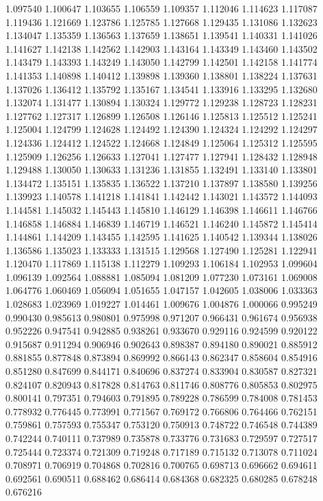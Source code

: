 1.097540
1.100647
1.103655
1.106559
1.109357
1.112046
1.114623
1.117087
1.119436
1.121669
1.123786
1.125785
1.127668
1.129435
1.131086
1.132623
1.134047
1.135359
1.136563
1.137659
1.138651
1.139541
1.140331
1.141026
1.141627
1.142138
1.142562
1.142903
1.143164
1.143349
1.143460
1.143502
1.143479
1.143393
1.143249
1.143050
1.142799
1.142501
1.142158
1.141774
1.141353
1.140898
1.140412
1.139898
1.139360
1.138801
1.138224
1.137631
1.137026
1.136412
1.135792
1.135167
1.134541
1.133916
1.133295
1.132680
1.132074
1.131477
1.130894
1.130324
1.129772
1.129238
1.128723
1.128231
1.127762
1.127317
1.126899
1.126508
1.126146
1.125813
1.125512
1.125241
1.125004
1.124799
1.124628
1.124492
1.124390
1.124324
1.124292
1.124297
1.124336
1.124412
1.124522
1.124668
1.124849
1.125064
1.125312
1.125595
1.125909
1.126256
1.126633
1.127041
1.127477
1.127941
1.128432
1.128948
1.129488
1.130050
1.130633
1.131236
1.131855
1.132491
1.133140
1.133801
1.134472
1.135151
1.135835
1.136522
1.137210
1.137897
1.138580
1.139256
1.139923
1.140578
1.141218
1.141841
1.142442
1.143021
1.143572
1.144093
1.144581
1.145032
1.145443
1.145810
1.146129
1.146398
1.146611
1.146766
1.146858
1.146884
1.146839
1.146719
1.146521
1.146240
1.145872
1.145414
1.144861
1.144209
1.143455
1.142595
1.141625
1.140542
1.139344
1.138026
1.136586
1.135023
1.133333
1.131515
1.129568
1.127490
1.125281
1.122941
1.120470
1.117869
1.115138
1.112279
1.109293
1.106184
1.102953
1.099604
1.096139
1.092564
1.088881
1.085094
1.081209
1.077230
1.073161
1.069008
1.064776
1.060469
1.056094
1.051655
1.047157
1.042605
1.038006
1.033363
1.028683
1.023969
1.019227
1.014461
1.009676
1.004876
1.000066
0.995249
0.990430
0.985613
0.980801
0.975998
0.971207
0.966431
0.961674
0.956938
0.952226
0.947541
0.942885
0.938261
0.933670
0.929116
0.924599
0.920122
0.915687
0.911294
0.906946
0.902643
0.898387
0.894180
0.890021
0.885912
0.881855
0.877848
0.873894
0.869992
0.866143
0.862347
0.858604
0.854916
0.851280
0.847699
0.844171
0.840696
0.837274
0.833904
0.830587
0.827321
0.824107
0.820943
0.817828
0.814763
0.811746
0.808776
0.805853
0.802975
0.800141
0.797351
0.794603
0.791895
0.789228
0.786599
0.784008
0.781453
0.778932
0.776445
0.773991
0.771567
0.769172
0.766806
0.764466
0.762151
0.759861
0.757593
0.755347
0.753120
0.750913
0.748722
0.746548
0.744389
0.742244
0.740111
0.737989
0.735878
0.733776
0.731683
0.729597
0.727517
0.725444
0.723374
0.721309
0.719248
0.717189
0.715132
0.713078
0.711024
0.708971
0.706919
0.704868
0.702816
0.700765
0.698713
0.696662
0.694611
0.692561
0.690511
0.688462
0.686414
0.684368
0.682325
0.680285
0.678248
0.676216

